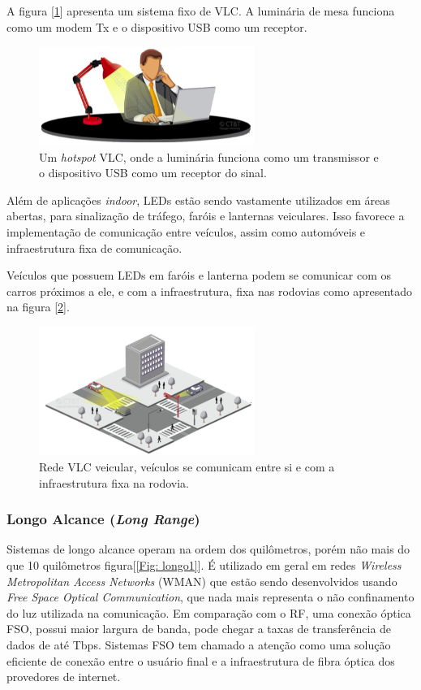 A figura [\ref{Fig: medio1}] apresenta um sistema fixo de VLC. A luminária de mesa funciona como um modem Tx e o dispositivo USB como um receptor.

\begin{figure}
	\centering
		\includegraphics[width = 7cm]{figuras/medio1}
	\caption{Um \textit{hotspot} VLC, onde a luminária funciona como um transmissor e o dispositivo USB como um receptor do sinal.}
	\label{Fig: medio1}
\end{figure}

Além de aplicações \textit{indoor}, LEDs estão sendo vastamente utilizados em áreas abertas, para sinalização de tráfego, faróis e lanternas veiculares. Isso favorece a implementação de comunicação entre veículos, assim como automóveis e infraestrutura fixa de comunicação. \cite{Vehicle}

Veículos que possuem LEDs em faróis e lanterna podem se comunicar com os carros próximos a ele, e com a infraestrutura, fixa nas rodovias como apresentado na figura [\ref{Fig: medio2}].

\begin{figure}
	\centering
		\includegraphics[width = 7cm]{figuras/medio2}
	\caption{Rede VLC veicular, veículos se comunicam entre si e com a infraestrutura fixa na rodovia.}
	\label{Fig: medio2}
\end{figure}


\subsubsection{Longo Alcance (\textit{Long Range})}

Sistemas de longo alcance operam na ordem dos quilômetros, porém não mais do que 10 quilômetros figura[\ref{Fig: longo1}]. É utilizado em geral em redes \textit{Wireless Metropolitan Access Networks} (WMAN) que estão sendo desenvolvidos usando \textit{Free Space Optical Communication}, que nada mais representa o não confinamento do luz utilizada na comunicação.
Em comparação com o RF, uma conexão óptica FSO, possui maior largura de banda, pode chegar a taxas de transferência de dados de até Tbps. \cite{g.parcaa.shahpariv.carrozzog.tossia.j.teixeira2008}
Sistemas FSO tem chamado a atenção como uma solução eficiente de conexão entre o usuário final e a infraestrutura de fibra óptica dos provedores de internet.

